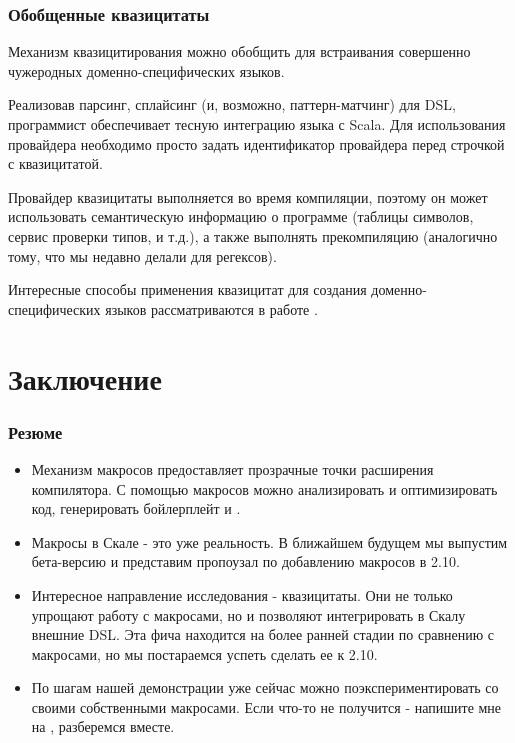 \documentclass[hyperref={bookmarks=false}]{beamer}
\begin{document}
\begin{frame}[t,fragile]
\frametitle{Обобщенные квазицитаты}
Механизм квазицитирования можно обобщить для встраивания совершенно чужеродных доменно-специфических языков.

Реализовав парсинг, сплайсинг (и, возможно, паттерн-матчинг) для DSL, программист обеспечивает тесную интеграцию языка с Scala. Для использования провайдера необходимо просто задать идентификатор провайдера перед строчкой с квазицитатой.

Провайдер квазицитаты выполняется во время компиляции, поэтому он может использовать семантическую информацию о программе (таблицы символов, сервис проверки типов, и т.д.), а также выполнять прекомпиляцию (аналогично тому, что мы недавно делали для регексов).

Интересные способы применения квазицитат для создания доменно-специфических языков рассматриваются в работе .

\end{frame}

\section{Заключение}

\begin{frame}[t,fragile]
\frametitle{Резюме}
\begin{itemize}
\item Механизм макросов предоставляет прозрачные точки расширения компилятора. С помощью макросов можно  анализировать и оптимизировать код, генерировать бойлерплейт и .
\item Макросы в Скале - это уже реальность. В ближайшем будущем мы выпустим бета-версию и представим пропоузал по добавлению макросов в 2.10.
\item Интересное направление исследования - квазицитаты. Они не только упрощают работу с макросами, но и позволяют интегрировать в Скалу внешние DSL. Эта фича находится на более ранней стадии по сравнению с макросами, но мы постараемся успеть сделать ее к 2.10.
\item По шагам нашей демонстрации уже сейчас можно поэкспериментировать со своими собственными макросами. Если что-то не получится - напишите мне на , разберемся вместе.
\end{itemize}
\end{frame}
\end{document}
